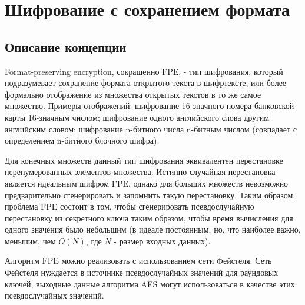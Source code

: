 \documentclass[utf8x, 14pt]{G7-32} %
\begin{document}
\frontmatter %

\maketitle %


\begin{executors}
\end{executors}

\tableofcontents %
 



\mainmatter %

\chapter{Шифрование с сохранением формата}

\section{Описание концепции}
Format-preserving encryption, сокращенно FPE, - тип шифрования, который подразумевает сохранение формата открытого текста в шифртексте, или более формально отображение из множества открытых текстов в то же самое множество. Примеры отображений: шифрование 16-значного номера банковской карты 16-значным числом; шифрование одного английского слова другим английским словом; шифрование n-битного числа n-битным числом (совпадает с определением n-битного блочного шифра).


Для конечных множеств данный тип шифрования эквивалентен перестановке перенумерованных элементов множества. Истинно случайная перестановка является идеальным шифром FPE, однако для больших множеств невозможно предварительно сгенерировать и запомнить такую перестановку. Таким образом, проблема FPE состоит в том, чтобы сгенерировать псевдослучайную перестановку из секретного ключа таким образом, чтобы время вычисления для одного значения было небольшим (в идеале постоянным, но, что наиболее важно, меньшим, чем $O(N)$, где $N$ - размер входных данных).


Алгоритм FPE можно реализовать с использованием сети Фейстеля. Сеть Фейстеля нуждается в источнике псевдослучайных значений для раундовых ключей, выходные данные алгоритма AES могут использоваться в качестве этих псевдослучайных значений. 
\end{document}
